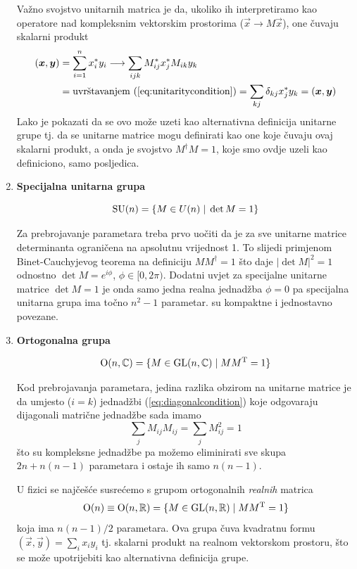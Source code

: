 \begin{enumerate}[leftmargin=0pt, itemindent=0pt]
Važno svojstvo unitarnih matrica je da, ukoliko ih interpretiramo kao
operatore nad kompleksnim vektorskim prostorima ($\vec{x} \to M\vec{x}$), 
one čuvaju skalarni produkt
\begin{align}
    (\vec{x}, \vec{y})& = \sum_{i=1}^n x_{i}^* y_i  \longrightarrow
   \sum_{ijk} M^{*}_{ij}x^{*}_j M_{ik}y_{k} \nonumber \\
 & = \text{uvrštavanjem
 (\ref{eq:unitaritycondition})} = \sum_{kj} \delta_{kj} x^{*}_j y_k = (\vec{x}, \vec{y})
\label{eq:productinvariance}
\end{align}
Lako je pokazati da se ovo može uzeti kao alternativna definicija
unitarne grupe tj. da se unitarne matrice mogu definirati kao one koje
čuvaju ovaj skalarni produkt, a onda je svojstvo $M^{\dagger} M = 1$, koje
smo ovdje uzeli kao definiciono, samo posljedica.

\item \textbf{Specijalna unitarna grupa}

\begin{equation}
\mathrm{SU}(n) = \{ M\in U(n) \; | \; \det M  = 1\}
\end{equation}

Za prebrojavanje parametara treba prvo uočiti da je za sve unitarne
matrice determinanta ograničena na apsolutnu vrijednost 1. To slijedi
primjenom Binet-Cauchyjevog teorema na definiciju $M M^{\dagger} = 1$
što daje $|\det M|^2 = 1$ odnostno $\det M = e^{i \phi}$, 
$\phi\in [0, 2\pi)$.
Dodatni uvjet za specijalne unitarne matrice $\det M = 1$ je onda
samo jedna realna jednadžba $\phi = 0$ pa specijalna unitarna grupa
ima točno $n^2 - 1$ parametar.  su kompaktne i jednostavno povezane.

\item \textbf{Ortogonalna grupa}

\begin{equation}
\mathrm{O}(n, \mathbb{C}) = \{ M\in \mathrm{GL}(n,\mathbb{C}) \; | \; M M^{\mathrm{T}} = 1\}
\end{equation}

Kod prebrojavanja parametara, jedina razlika obzirom na unitarne matrice
je da umjesto ($i=k$) jednadžbi (\ref{eq:diagonalcondition}) 
koje odgovaraju dijagonali matrične jednadžbe sada imamo
\begin{equation}
 \sum_j M_{ij} M_{ij} = \sum_j M_{ij}^2 = 1
\end{equation}
što su kompleksne jednadžbe pa možemo eliminirati sve skupa
$2n + n(n-1)$ parametara i ostaje ih samo $n(n-1)$.

U fizici se najčešće susrećemo s grupom ortogonalnih \emph{realnih} matrica
\begin{equation}
\mathrm{O}(n) \equiv \mathrm{O}(n, \mathbb{R}) = \{ M\in \mathrm{GL}(n,\mathbb{R}) \; | \; M M^{\mathrm{T}} = 1\}
\end{equation}
koja ima $n(n-1)/2$ parametara. Ova grupa čuva
kvadratnu formu $(\vec{x}, \vec{y}) = \sum_i x_i y_i$ tj. skalarni produkt na realnom
vektorskom prostoru, što se može upotrijebiti kao alternativna definicija grupe.


\end{enumerate}
